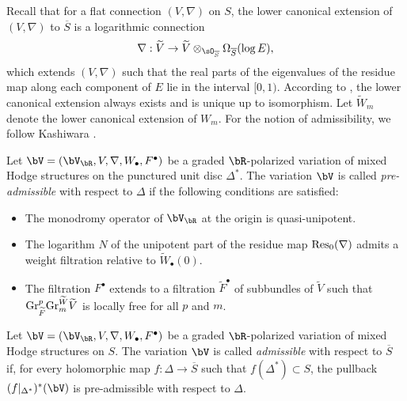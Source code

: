 \documentclass[11pt,letterpaper]{amsart}
\numberwithin{equation}{section}
\begin{document}
Recall that for a flat connection $(V, \nabla)$ on $S$, the lower canonical extension of $(V, \nabla)$ to $\overline{S}$ is a logarithmic connection  
\[
\nabla: \widetilde{V} \to \widetilde{V} \otimes_{\sO_{\overline{S}}} \Omega_{\overline{S}}(\log E),
\]  
which extends $(V, \nabla)$ such that the real parts of the eigenvalues of the residue map along each component of $E$ lie in the interval $[0,1)$. According to \cite[Proposition 5.4]{Deligne1970}, the lower canonical extension always exists and is unique up to isomorphism. Let $\widetilde{W}_m$ denote the lower canonical extension of $W_m$. For the notion of admissibility, we follow Kashiwara \cite{Kashiwara1986}. 
\begin{defn}  
	Let $\bV = (\bV_{\bR}, V, \nabla, W_\bullet, F^\bullet)$ be a graded $\bR$-polarized variation of mixed Hodge structures on the punctured unit disc $\Delta^\ast$. The variation $\bV$ is called \emph{pre-admissible} with respect to $\Delta$ if the following conditions are satisfied:  
	\begin{itemize}  
		\item The monodromy operator of $\bV_{\bR}$ at the origin is quasi-unipotent.  
		\item The logarithm $N$ of the unipotent part of the residue map ${\rm Res}_0(\nabla)$ admits a weight filtration relative to $\widetilde{W}_\bullet(0)$.  
		\item The filtration $F^\bullet$ extends to a filtration $\widetilde{F}^\bullet$ of subbundles of $\widetilde{V}$ such that ${\rm Gr}_{\widetilde{F}}^p {\rm Gr}^{\widetilde{W}}_m \widetilde{V}$ is locally free for all $p$ and $m$.  
	\end{itemize}  
\end{defn}
\begin{defn}  
	Let $\bV = (\bV_{\bR}, V, \nabla, W_\bullet, F^\bullet)$ be a graded $\bR$-polarized variation of mixed Hodge structures on $S$. The variation $\bV$ is called \emph{admissible} with respect to $\overline{S}$ if, for every holomorphic map $f: \Delta \to \overline{S}$ such that $f(\Delta^\ast) \subset S$, the pullback $(f|_{\Delta^\ast})^\ast(\bV)$ is pre-admissible with respect to $\Delta$.  
\end{defn}
\end{document}
